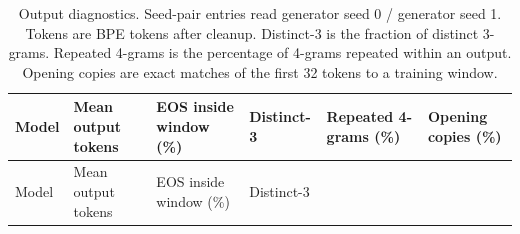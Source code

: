 \documentclass[
  british,
]{article}
\begin{document}
\begin{longtable}[]{@{}
  >{\raggedright\arraybackslash}p{}
  >{\raggedleft\arraybackslash}p{}
  >{\raggedleft\arraybackslash}p{}
  >{\raggedleft\arraybackslash}p{}
  >{\raggedleft\arraybackslash}p{}
  >{\raggedleft\arraybackslash}p{}@{}}
\caption{Output diagnostics. Seed-pair entries read generator seed 0 /
generator seed 1. Tokens are BPE tokens after cleanup. Distinct-3 is the
fraction of distinct 3-grams. Repeated 4-grams is the percentage of
4-grams repeated within an output. Opening copies are exact matches of
the first 32 tokens to a training window.}\tabularnewline
\toprule\noalign{}
\begin{minipage}[b]{\linewidth}\raggedright
Model
\end{minipage} & \begin{minipage}[b]{\linewidth}\raggedleft
Mean output tokens
\end{minipage} & \begin{minipage}[b]{\linewidth}\raggedleft
EOS inside window (\%)
\end{minipage} & \begin{minipage}[b]{\linewidth}\raggedleft
Distinct-3
\end{minipage} & \begin{minipage}[b]{\linewidth}\raggedleft
Repeated 4-grams (\%)
\end{minipage} & \begin{minipage}[b]{\linewidth}\raggedleft
Opening copies (\%)
\end{minipage} \\
\midrule\noalign{}
\endfirsthead
\toprule\noalign{}
\begin{minipage}[b]{\linewidth}\raggedright
Model
\end{minipage} & \begin{minipage}[b]{\linewidth}\raggedleft
Mean output tokens
\end{minipage} & \begin{minipage}[b]{\linewidth}\raggedleft
EOS inside window (\%)
\end{minipage} & \begin{minipage}[b]{\linewidth}\raggedleft
Distinct-3
\end{minipage} & \begin{minipage}[b]{\linewidth}\raggedleft

\end{minipage}
\end{longtable}
\end{document}
